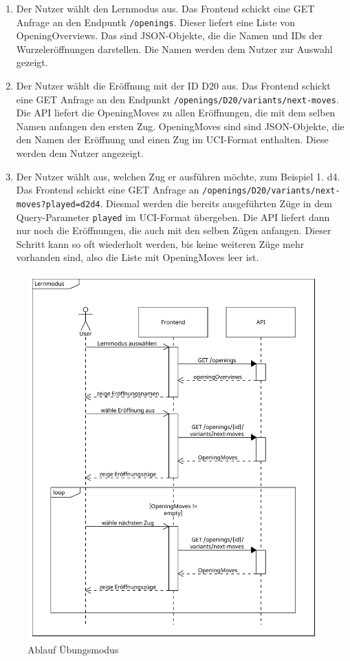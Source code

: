 \begin{enumerate}
     \item Der Nutzer wählt den Lernmodus aus. Das Frontend schickt eine GET Anfrage an den Endpuntk \lstinline{/openings}. Dieser liefert eine Liste von OpeningOverviews. Das sind JSON-Objekte, die die Namen und IDs der Wurzeleröffnungen darstellen. Die Namen werden dem Nutzer zur Auswahl gezeigt.
     \item Der Nutzer wählt die Eröffnung mit der ID D20 aus. Das Frontend schickt eine GET Anfrage an den Endpunkt \lstinline|/openings/D20/variants/next-moves|. Die API liefert die OpeningMoves zu allen Eröffnungen, die mit dem selben Namen anfangen den ersten Zug. OpeningMoves sind sind JSON-Objekte, die den Namen der Eröffnung und einen Zug im UCI-Format enthalten. Diese werden dem Nutzer angezeigt.
     \item Der Nutzer wählt aus, welchen Zug er ausführen möchte, zum Beispiel 1. d4. Das Frontend schickt eine GET Anfrage an \lstinline|/openings/D20/variants/next-moves?played=d2d4|. Diesmal werden die bereits ausgeführten Züge in dem Query-Parameter \lstinline{played} im UCI-Format übergeben. Die API liefert dann nur noch die Eröffnungen, die auch mit den selben Zügen anfangen. Dieser Schritt kann so oft wiederholt werden, bis keine weiteren Züge mehr vorhanden sind, also die Liste mit OpeningMoves leer ist.
\end{enumerate}

\begin{figure}
    \includegraphics[width=\linewidth]{images/diagrams/sd_opening_training}
    \caption{Ablauf Übungsmodus}
    \label{fig:sd_opening_training}
\end{figure}

